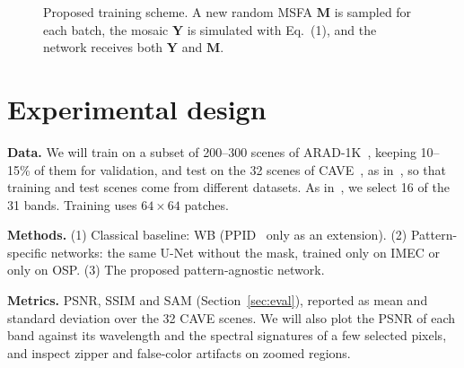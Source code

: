 \documentclass{article}
\def\X{{\mathbf X}}
\def\Y{{\mathbf Y}}
\def\M{{\mathbf M}}
\begin{document}
\begin{figure}[htb]
\centering
{}
\caption{Proposed training scheme. A new random MSFA $\M$ is sampled for each
batch, the mosaic $\Y$ is simulated with Eq.~(1), and the network receives
both $\Y$ and $\M$.}
\label{fig:method}
\end{figure}

\section{Experimental design}
\label{sec:experiments}

\textbf{Data.} We will train on a subset of 200--300 scenes of
ARAD-1K~\cite{arad2022}, keeping 10--15\% of them for validation, and
test on the 32 scenes of CAVE~\cite{yasuma2010},
as in~\cite{diaz2023}, so that training and test scenes come from different
datasets. As in~\cite{diaz2023}, we select 16 of the 31 bands. Training uses
$64\times64$ patches.

\textbf{Methods.} (1) Classical baseline: WB (PPID~\cite{mihoubi2017} only as an
extension). (2) Pattern-specific
networks: the same U-Net without the mask, trained only on IMEC or only on
OSP. (3) The proposed pattern-agnostic network.

\textbf{Metrics.} PSNR, SSIM and SAM (Section~\ref{sec:eval}), reported as
mean and standard deviation over the 32 CAVE scenes. We will also plot the
PSNR of each band against its wavelength and the spectral signatures of a few
selected pixels, and inspect zipper and false-color artifacts on zoomed
regions.
\end{document}
